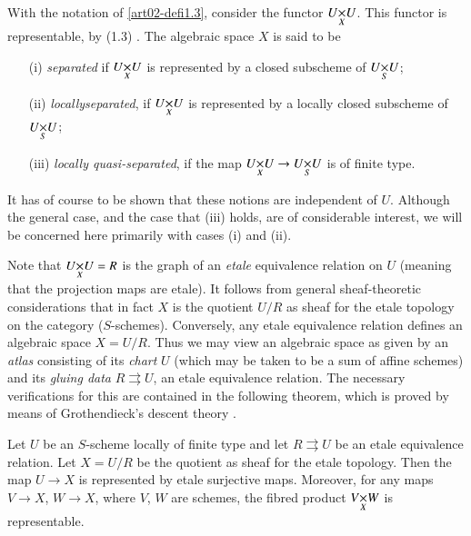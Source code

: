 \setcounter{sconditions}{3}
\begin{sconditions}\label{art02-sc1.4}
With the notation of \eqref{art02-defi1.3}, consider the functor $\fprod{U}{U}{X}$. This functor is representable, by (1.3) \cite{art02-key2}. The algebraic space $X$ is said to be
\begin{itemize}
\item[(i)] {\em separated} if $\fprod{U}{U}{X}$ is represented by a closed subscheme of $\fprod{U}{U}{S}$;

\item[(ii)] {\em locally\pageoriginale separated}, if $\fprod{U}{U}{X}$ is represented by a locally closed subscheme of $\fprod{U}{U}{S}$;

\item[(iii)] {\em locally quasi-separated}, if the map $\fprod{U}{U}{X}\to \fprod{U}{U}{S}$ is of finite type.
\end{itemize}

It has of course to be shown that these notions are independent of $U$. Although the general case, and the case that (iii) holds, are of considerable interest, we will be concerned here primarily with cases (i) and (ii).

Note that $\fprod{U}{U}{X}=R$ is the graph of an {\em etale} equivalence relation on $U$ (meaning that the projection maps are etale). It follows from general sheaf-theoretic considerations \cite[II.4.3]{art02-key6} that in fact $X$ is the quotient $U/R$ as sheaf for the etale topology on the category ($S$-schemes). Conversely, any etale equivalence relation defines an algebraic space $X=U/R$. Thus we may view an algebraic space as given by an {\em atlas} consisting of its {\em chart} $U$ (which may be taken to be a sum of affine schemes) and its {\em gluing data} $R\rightrightarrows U$, an etale equivalence relation. The necessary verifications for this are contained in the following theorem, which is proved by means of Grothendieck's descent theory \cite[VIII]{art02-key14}.
\end{sconditions}

\setcounter{theorem}{4}
\begin{theorem}\label{art02-thm1.5}
Let $U$ be an $S$-scheme locally of finite type and let $R\rightrightarrows U$ be an etale equivalence relation. Let $X=U/R$ be the quotient as sheaf for the etale topology. Then the map $U\to X$ is represented by etale surjective maps. Moreover, for any maps $V\to X$, $W\to X$, where $V$, $W$ are schemes, the fibred product $\fprod{V}{W}{X}$ is representable.
\end{theorem}

